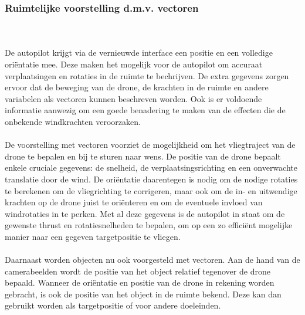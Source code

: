 \subsubsection{Ruimtelijke voorstelling d.m.v. vectoren}
\\
\\
De autopilot krijgt via de vernieuwde interface een positie en een volledige ori\"entatie mee. Deze maken het mogelijk voor de autopilot om accuraat verplaatsingen en rotaties in de ruimte te bechrijven. De extra gegevens zorgen ervoor dat de beweging van de drone, de krachten in de ruimte en andere variabelen als vectoren kunnen beschreven worden. Ook is er voldoende informatie aanwezig om een goede benadering te maken van de effecten die de onbekende windkrachten veroorzaken.
\\
\\
De voorstelling met vectoren voorziet de mogelijkheid om het vliegtraject van de drone te bepalen en bij te sturen naar wens. De positie van de drone bepaalt enkele cruciale gegevens: de snelheid, de verplaatsingsrichting en een onverwachte translatie door de wind. De ori\"entatie daarentegen is nodig om de nodige rotaties te berekenen om de vliegrichting te corrigeren, maar ook om de in- en uitwendige krachten op de drone juist te ori\"enteren en om de eventuele invloed van windrotaties in te perken. Met al deze gegevens is de autopilot in staat om de gewenste thrust en rotatiesnelheden te bepalen, om op een zo effici\"ent mogelijke manier naar een gegeven targetpositie te vliegen.
\\
\\
Daarnaast worden objecten nu ook voorgesteld met vectoren. Aan de hand van de camerabeelden wordt de positie van het object relatief tegenover de drone bepaald. Wanneer de ori\"entatie en positie van de drone in rekening worden gebracht, is ook de positie van het object in de ruimte bekend. Deze kan dan gebruikt worden als targetpositie of voor andere doeleinden.
